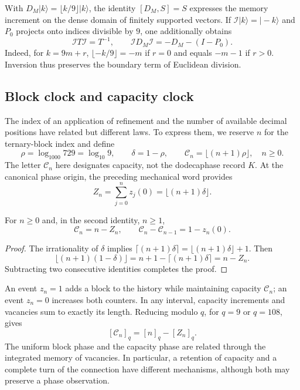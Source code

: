 With \(D_M|k\rangle=\lfloor k/9\rfloor|k\rangle\), the identity
\([D_M,S]=S\) expresses the memory increment on the dense domain of
finitely supported vectors. If \(\mathcal I|k\rangle=|-k\rangle\) and
\(P_0\) projects onto indices divisible by \(9\), one additionally obtains
\begin{equation}
 \mathcal I T\mathcal I=T^{-1},\qquad
 \mathcal I D_M\mathcal I=-D_M-(I-P_0).
 \label{mono-ampl:inversion-contador}
\end{equation}
Indeed, for \(k=9m+r\),
\(\lfloor-k/9\rfloor=-m\) if \(r=0\) and equals \(-m-1\) if \(r>0\).
Inversion thus preserves the boundary term of Euclidean division.

\subsection{Block clock and capacity clock}
\label{mono-ampl:relojes}

The index of an application of refinement and the number of available
decimal positions have related but different laws. To
express them, we reserve \(n\) for the ternary-block index and define
\[
 \rho=\log_{1000}729=\log_{10}9,\qquad
 \delta=1-\rho,\qquad
 \mathcal C_n=\lfloor(n+1)\rho\rfloor,\quad n\geq0.
\]
The letter \(\mathcal C_n\) here designates capacity, not the dodecaphase
record \(K\). At the canonical phase origin, the preceding mechanical
word provides
\[
 Z_n=\sum_{j=0}^{n}z_j(0)=\lfloor(n+1)\delta\rfloor.
\]

\begin{proposition}
\label{mono-ampl:balance-capacidad}
For \(n\geq0\) and, in the second identity, \(n\geq1\),
\[
 \mathcal C_n=n-Z_n,\qquad
 \mathcal C_n-\mathcal C_{n-1}=1-z_n(0).
\]
\end{proposition}
\begin{proof}
The irrationality of \(\delta\) implies
\(\lceil(n+1)\delta\rceil=\lfloor(n+1)\delta\rfloor+1\).
Then
\[
 \lfloor(n+1)(1-\delta)\rfloor
 =n+1-\lceil(n+1)\delta\rceil=n-Z_n.
\]
Subtracting two consecutive identities completes the proof.
\end{proof}

An event \(z_n=1\) adds a block to the history while maintaining capacity
\(\mathcal C_n\); an event \(z_n=0\) increases both counters. In
any interval, capacity increments and vacancies sum to
exactly its length. Reducing modulo \(q\), for \(q=9\) or
\(q=108\), gives
\[
 [\mathcal C_n]_q=[n]_q-[Z_n]_q.
\]
The uniform block phase and the capacity phase are related through
the integrated memory of vacancies. In particular, a retention of
capacity and a complete turn of the connection have different
mechanisms, although both may preserve a phase observation.

